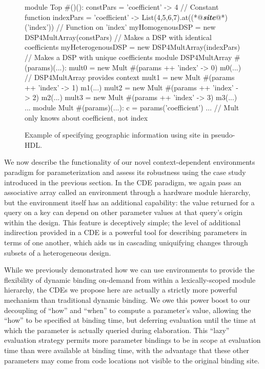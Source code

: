 \begin{figure}
\centering
\begin{phdl}
module Top #()():
  constPars = { 'coefficient' -> 4 }                               // Constant function
  indexPars = { 'coefficient' -> List(4,5,6,7).at((*@\textcolor[rgb]{1,0.5,0}{\textbf{\textit{site}}}@*)('index')) } // Function on 'index'
  myHomogenousDSP   = new DSP4MultArray(constPars)     // Makes a DSP with identical coefficients
  myHeterogenousDSP = new DSP4MultArray(indexPars)     // Makes a DSP with unique coefficients
module DSP4MultArray #(params)(...):
  mult0 = new Mult #(params ++ {'index' -> 0}) m0(...) // DSP4MultArray provides context
  mult1 = new Mult #(params ++ {'index' -> 1}) m1(...)
  mult2 = new Mult #(params ++ {'index' -> 2}) m2(...)
  mult3 = new Mult #(params ++ {'index' -> 3}) m3(...) ...
module Mult #(params)(...):
  c = params('coefficient') ...                        // Mult only knows about coefficient, not index
\end{phdl}
\caption{Example of specifying geographic information using site in pseudo-HDL.}
\label{fig:site-phdl}
\end{figure}

We now describe the functionality of our novel context-dependent environments paradigm for parameterization
and assess its robustness using the case study introduced in the previous section.
In the CDE paradigm, we again pass an associative array called an environment through a hardware module hierarchy, but the environment itself has an additional capability:
the value returned for a query on a key can depend on other parameter values at that query's origin within the design.
This feature is deceptively simple; the level of additional indirection provided in a CDE is a powerful tool for describing
parameters in terms of one another, which aids us in cascading uniquifying changes through subsets of a heterogeneous design.

While we previously demonstrated how we can use environments to provide the flexibility of dynamic binding on-demand from within a lexically-scoped module hierarchy, 
the CDEs we propose here are actually a strictly more powerful mechanism than traditional dynamic binding. 
We owe this power boost to our decoupling of ``how'' and ``when'' to compute a parameter's value,
allowing the ``how'' to be specified at binding time,
but deferring evaluation until the time at which the parameter is actually queried during elaboration.
This ``lazy'' evaluation strategy permits more parameter bindings to be in scope at
evaluation time than were available at binding time,
with the advantage that these other parameters may come from code locations not visible to the original binding site.

